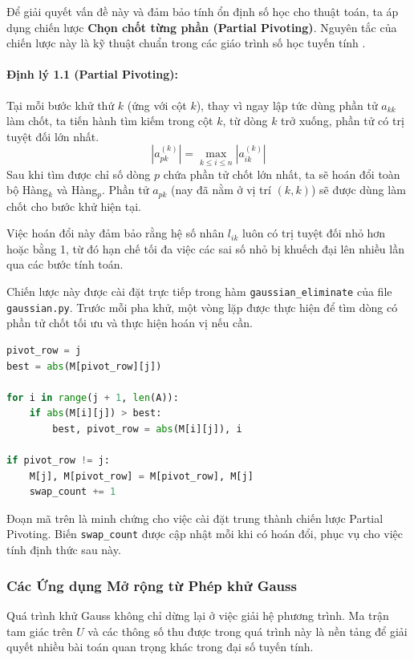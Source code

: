 Để giải quyết vấn đề này và đảm bảo tính ổn định số học cho thuật toán, ta áp dụng chiến lược \textbf{Chọn chốt từng phần (Partial Pivoting)}. Nguyên tắc của chiến lược này là kỹ thuật chuẩn trong các giáo trình số học tuyến tính \cite{golub,trefethen}.

\paragraph{Định lý 1.1 (Partial Pivoting):} Tại mỗi bước khử thứ $k$ (ứng với cột $k$), thay vì ngay lập tức dùng phần tử $a_{kk}$ làm chốt, ta tiến hành tìm kiếm trong cột $k$, từ dòng $k$ trở xuống, phần tử có trị tuyệt đối lớn nhất.
\begin{equation}
    |a_{pk}^{(k)}| = \max_{k \le i \le n} |a_{ik}^{(k)}|
\end{equation}
Sau khi tìm được chỉ số dòng $p$ chứa phần tử chốt lớn nhất, ta sẽ hoán đổi toàn bộ Hàng$_k$ và Hàng$_p$. Phần tử $a_{pk}$ (nay đã nằm ở vị trí $(k,k)$) sẽ được dùng làm chốt cho bước khử hiện tại.

Việc hoán đổi này đảm bảo rằng hệ số nhân $l_{ik}$ luôn có trị tuyệt đối nhỏ hơn hoặc bằng 1, từ đó hạn chế tối đa việc các sai số nhỏ bị khuếch đại lên nhiều lần qua các bước tính toán.

Chiến lược này được cài đặt trực tiếp trong hàm \texttt{gaussian\_eliminate} của file \texttt{gaussian.py}. Trước mỗi pha khử, một vòng lặp được thực hiện để tìm dòng có phần tử chốt tối ưu và thực hiện hoán vị nếu cần.

\begin{lstlisting}[language=Python, caption={Trích đoạn logic tìm và hoán đổi chốt từ \texttt{gaussian.py}}]
pivot_row = j
best = abs(M[pivot_row][j])

for i in range(j + 1, len(A)):
    if abs(M[i][j]) > best:
        best, pivot_row = abs(M[i][j]), i

if pivot_row != j:
    M[j], M[pivot_row] = M[pivot_row], M[j]
    swap_count += 1
\end{lstlisting}
Đoạn mã trên là minh chứng cho việc cài đặt trung thành chiến lược Partial Pivoting. Biến \texttt{swap\_count} được cập nhật mỗi khi có hoán đổi, phục vụ cho việc tính định thức sau này.

\subsubsection{Các Ứng dụng Mở rộng từ Phép khử Gauss}
\label{sec:extended_applications}
Quá trình khử Gauss không chỉ dừng lại ở việc giải hệ phương trình. Ma trận tam giác trên $U$ và các thông số thu được trong quá trình này là nền tảng để giải quyết nhiều bài toán quan trọng khác trong đại số tuyến tính.


